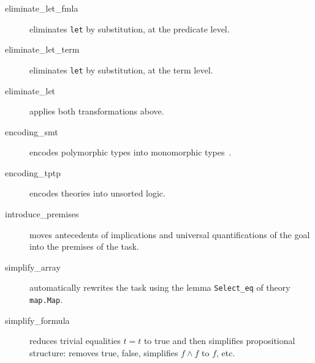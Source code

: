 \begin{description}
\item[eliminate\_let\_fmla]
  eliminates \texttt{let} by substitution, at the predicate level.

\item[eliminate\_let\_term]
  eliminates \texttt{let} by substitution, at the term level.

\item[eliminate\_let]
  applies both transformations above.



\item[encoding\_smt]
  encodes polymorphic types into monomorphic types~\cite{conchon08smt}.

\item[encoding\_tptp]
  encodes theories into unsorted logic. %





\item[introduce\_premises] moves antecedents of implications and
  universal quantifications of the goal into the premises of the task.


\item[simplify\_array] automatically rewrites the task using the lemma
  \verb|Select_eq| of theory \verb|map.Map|.

\item[simplify\_formula] reduces trivial equalities $t=t$ to true and
  then simplifies propositional structure: removes true, false, simplifies
  $f \land f$ to $f$, etc.


\end{description}
